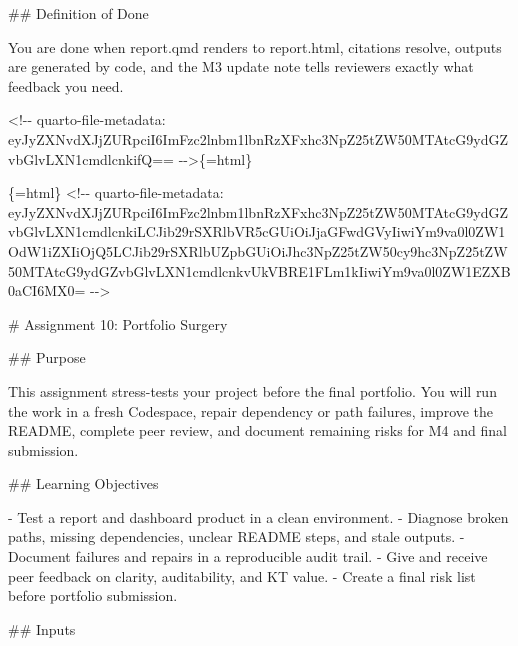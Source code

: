 \documentclass[
  letterpaper,
  DIV=11,
  numbers=noendperiod,
  oneside]{scrreprt}
\newenvironment{Shaded}{\begin{snugshade}}{\end{snugshade}}
\newcommand{\FunctionTok}[1]{\textcolor[rgb]{0.28,0.35,0.67}{#1}}
\newcommand{\InformationTok}[1]{\textcolor[rgb]{0.37,0.37,0.37}{#1}}
\newcommand{\NormalTok}[1]{\textcolor[rgb]{0.00,0.23,0.31}{#1}}
\newcommand{\SpecialStringTok}[1]{\textcolor[rgb]{0.13,0.47,0.30}{#1}}
\begin{document}
\begin{Shaded}
\begin{Highlighting}[numbers=left,,]
\FunctionTok{\#\# Definition of Done}

\NormalTok{You are done when }\InformationTok{\textasciigrave{}report.qmd\textasciigrave{}}\NormalTok{ renders to }\InformationTok{\textasciigrave{}report.html\textasciigrave{}}\NormalTok{, citations resolve, outputs are generated by code, and the M3 update note tells reviewers exactly what feedback you need.}


\InformationTok{\textasciigrave{}\textless{}!{-}{-} quarto{-}file{-}metadata: eyJyZXNvdXJjZURpciI6ImFzc2lnbm1lbnRzXFxhc3NpZ25tZW50MTAtcG9ydGZvbGlvLXN1cmdlcnkifQ== {-}{-}\textgreater{}\textasciigrave{}}\NormalTok{\{=html\}}

\InformationTok{\textasciigrave{}\textasciigrave{}\textasciigrave{}\{=html\}}
\InformationTok{\textless{}!{-}{-} quarto{-}file{-}metadata: eyJyZXNvdXJjZURpciI6ImFzc2lnbm1lbnRzXFxhc3NpZ25tZW50MTAtcG9ydGZvbGlvLXN1cmdlcnkiLCJib29rSXRlbVR5cGUiOiJjaGFwdGVyIiwiYm9va0l0ZW1OdW1iZXIiOjQ5LCJib29rSXRlbUZpbGUiOiJhc3NpZ25tZW50cy9hc3NpZ25tZW50MTAtcG9ydGZvbGlvLXN1cmdlcnkvUkVBRE1FLm1kIiwiYm9va0l0ZW1EZXB0aCI6MX0= {-}{-}\textgreater{}}
\InformationTok{\textasciigrave{}\textasciigrave{}\textasciigrave{}}

\FunctionTok{\# Assignment 10: Portfolio Surgery }


\FunctionTok{\#\# Purpose}

\NormalTok{This assignment stress{-}tests your project before the final portfolio. You will run the work in a fresh Codespace, repair dependency or path failures, improve the README, complete peer review, and document remaining risks for M4 and final submission.}

\FunctionTok{\#\# Learning Objectives}

\SpecialStringTok{{-} }\NormalTok{Test a report and dashboard product in a clean environment.}
\SpecialStringTok{{-} }\NormalTok{Diagnose broken paths, missing dependencies, unclear README steps, and stale outputs.}
\SpecialStringTok{{-} }\NormalTok{Document failures and repairs in a reproducible audit trail.}
\SpecialStringTok{{-} }\NormalTok{Give and receive peer feedback on clarity, auditability, and KT value.}
\SpecialStringTok{{-} }\NormalTok{Create a final risk list before portfolio submission.}

\FunctionTok{\#\# Inputs}


\end{Highlighting}
\end{Shaded}
\end{document}
